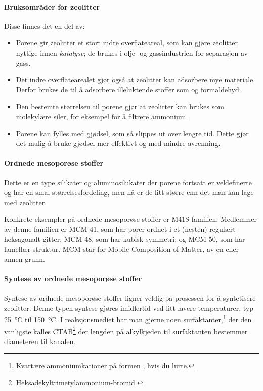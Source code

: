 \paragraph{Bruksområder for zeolitter} Disse finnes det en del av:
\begin{itemize}
	\item Porene gir zeolitter et stort indre overflateareal, som kan gjøre zeolitter nyttige innen \emph{katalyse}; de brukes i olje- og gassindustrien for separasjon av gass.
	\item Det indre overflatearealet gjør også at zeolitter kan adsorbere mye materiale. Derfor brukes de til å adsorbere illeluktende stoffer som  og formaldehyd.
	\item Den bestemte størrelsen til porene gjør at zeolitter kan brukes som molekylære siler, for eksempel for å filtrere ammonium.
	\item Porene kan fylles med gjødsel, som så slippes ut over lengre tid. Dette gjør det mulig å bruke gjødsel mer effektivt og med mindre avrenning. 
\end{itemize}

\paragraph{Ordnede mesoporøse stoffer} Dette er en type silikater og aluminosilukater der porene fortsatt er veldefinerte og har en smal størrelsesfordeling, men nå er de litt større enn det man kan lage med zeolitter. 

Konkrete eksempler på ordnede mesoporøse stoffer er M41S-familien. Medlemmer av denne familien er MCM-41, som har porer ordnet i et (nesten) regulært heksagonalt gitter; MCM-48, som har kubisk symmetri; og MCM-50, som har lamellær struktur. MCM står for Mobile Composition of Matter, av en eller annen grunn.

\paragraph{Syntese av ordnede mesoporøse stoffer} Syntese av ordnede mesoporøse stoffer ligner veldig på prosessen for å syntetisere zeolitter. Denne typen syntese gjøres imidlertid ved litt lavere temperaturer, typ \SI{25}{\celsius} til \SI{150}{\celsius}. I reaksjonsmediet har man gjerne noen surfaktanter,\footnote{Kvartære ammoniumkationer på formen , hvis du lurte.} der den vanligste kalles CTAB\footnote{Heksadekyltrimetylammonium-bromid.} der lengden på alkylkjeden til surfaktanten bestemmer diameteren til kanalen. 

